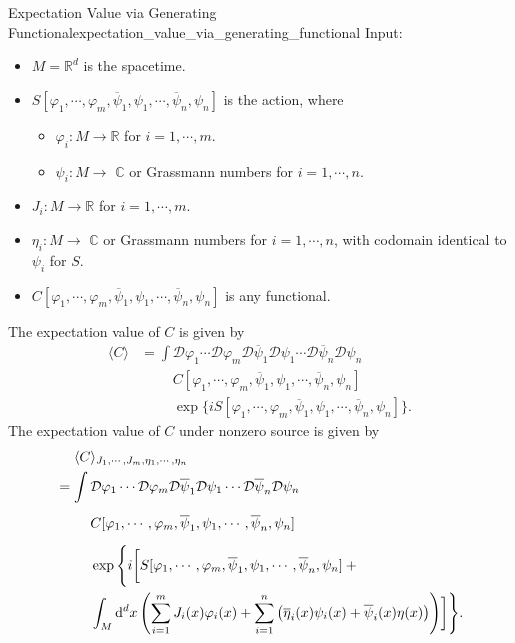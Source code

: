 \documentclass{article}
\begin{document}
\begin{definition}{Expectation Value via Generating Functional}{expectation_value_via_generating_functional}
    Input:
    \begin{itemize}[nosep]
        \item $M = \mathbb{R}^{d}$ is the spacetime.
        \item $S[\varphi_1, \cdots, \varphi_m, \overline{\psi}_1,\psi_1,\cdots,\overline{\psi}_n,\psi_n]$ is the action, where
        \begin{itemize}[nosep]
            \item $\varphi_i: M \rightarrow \mathbb{R}$ for $i = 1,\cdots,m$.
            \item $\psi_i: M \rightarrow$ $\mathbb{C}$ or Grassmann numbers for $i = 1,\cdots, n$.
        \end{itemize}
        \item $J_i: M \rightarrow \mathbb{R}$ for $i = 1,\cdots,m$.
        \item $\eta_i: M \rightarrow$ $\mathbb{C}$ or Grassmann numbers for $i = 1,\cdots, n$, with codomain identical to $\psi_i$ for $S$.
        \item $C[\varphi_1, \cdots, \varphi_m, \overline{\psi}_1,\psi_1,\cdots,\overline{\psi}_n,\psi_n]$ is any functional.
    \end{itemize}
    The expectation value of $C$ is given by
    \begin{align*}
        \langle C \rangle &= \int \mathcal{D}\varphi_1 \cdots \mathcal{D}\varphi_m \mathcal{D} \overline{\psi}_1 \mathcal{D}\psi_1 \cdots \mathcal{D}\overline{\psi}_n \mathcal{D}\psi_n \\
        &\phantom{{}={}\int} C[\varphi_1, \cdots, \varphi_m, \overline{\psi}_1,\psi_1,\cdots,\overline{\psi}_n,\psi_n] \\
        &\phantom{{}={}\int} \exp\Bigg\{iS[\varphi_1, \cdots, \varphi_m, \overline{\psi}_1,\psi_1,\cdots,\overline{\psi}_n,\psi_n] \Bigg\}.
    \end{align*}
    The expectation value of $C$ under nonzero source is given by
    \begin{align*}
        &{\phantom{{}={}}} \langle C \rangle_{J_1,\cdots,J_m,\eta_1,\cdots,\eta_n} \\
        &= \int \mathcal{D}\varphi_1 \cdots \mathcal{D}\varphi_m \mathcal{D} \overline{\psi}_1 \mathcal{D}\psi_1 \cdots \mathcal{D}\overline{\psi}_n \mathcal{D}\psi_n \\
        &\phantom{{}={}\int} C[\varphi_1, \cdots, \varphi_m, \overline{\psi}_1,\psi_1,\cdots,\overline{\psi}_n,\psi_n] \\
        &\phantom{{}={}\int} \exp\Bigg\{i\bigg[S[\varphi_1, \cdots, \varphi_m, \overline{\psi}_1,\psi_1,\cdots,\overline{\psi}_n,\psi_n] {}+{} \\
        &\phantom{{}={}\int }\int_M \dd{^d x} \qty(\sum_{i=1}^mJ_i(x)\varphi_i(x) + \sum_{i=1}^n \qty(\overline{\eta}_i(x)\psi_i(x) + \overline{\psi}_i(x)\eta(x))) \bigg]\Bigg\}.
    \end{align*}
\end{definition}
\end{document}
